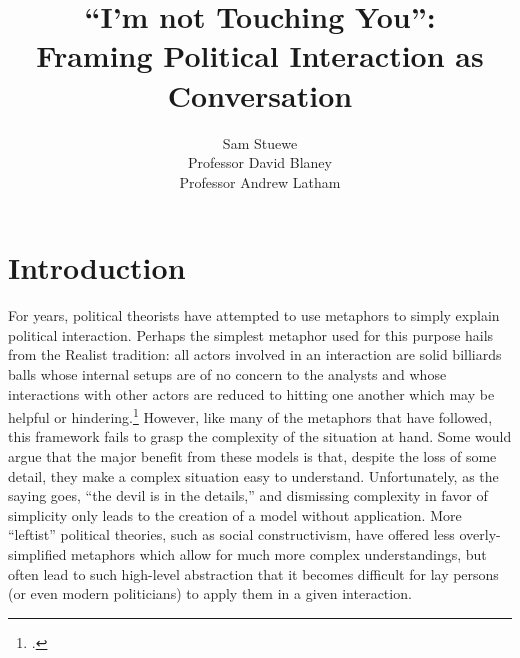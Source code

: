 \documentclass[letterpaper,12pt]{article}
\begin{document}
\title{``I'm not Touching You'':\\ Framing Political Interaction as Conversation}
\author{Sam Stuewe\\ Professor David Blaney 
   \\ Professor Andrew Latham}
\maketitle
\thispagestyle{empty}
\newpage
\tableofcontents
\thispagestyle{empty}
\newpage
\setcounter{page}{1}
\section{Introduction}
For years, political theorists have attempted to use metaphors to simply explain political interaction. 
Perhaps the simplest metaphor used for this purpose hails from the Realist tradition: all actors involved in an interaction are solid billiards balls whose internal setups are of no concern to the analysts and whose interactions with other actors are reduced to hitting one another which may be helpful or hindering.\footcite{mearsheimer01} 
However, like many of the metaphors that have followed, this framework fails to grasp the complexity of the situation at hand. 
Some would argue that the major benefit from these models is that, despite the loss of some detail, they make a complex situation easy to understand. 
Unfortunately, as the saying goes, ``the devil is in the details,'' and dismissing complexity in favor of simplicity only leads to the creation of a model without application. 
More ``leftist'' political theories, such as social constructivism, have offered less overly-simplified metaphors which allow for much more complex understandings, but often lead to such high-level abstraction that it becomes difficult for lay persons (or even modern politicians) to apply them in a given interaction.
\end{document}
